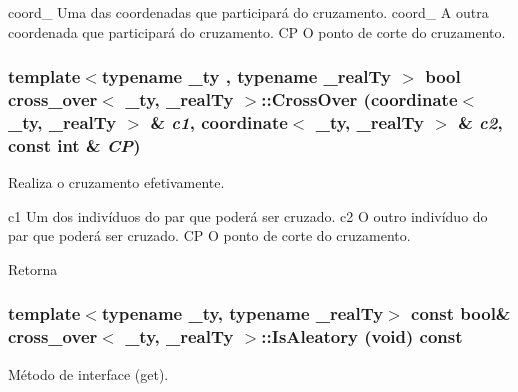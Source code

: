 coord\_ Uma das coordenadas que participará do cruzamento.  coord\_ A outra coordenada que participará do cruzamento.  CP O ponto de corte do cruzamento. \hypertarget{classcross__over_ace759185adf45d08ece996286c69542f}{
\subsubsection[{CrossOver}]{\setlength{\rightskip}{0pt plus 5cm}template$<$typename \_\-ty , typename \_\-realTy $>$ bool {\bf cross\_\-over}$<$ \_\-ty, \_\-realTy $>$::CrossOver ({\bf coordinate}$<$ \_\-ty, \_\-realTy $>$ \& {\em c1}, \/  {\bf coordinate}$<$ \_\-ty, \_\-realTy $>$ \& {\em c2}, \/  const int \& {\em CP})}}
\label{classcross__over_ace759185adf45d08ece996286c69542f}
Realiza o cruzamento efetivamente.

c1 Um dos indivíduos do par que poderá ser cruzado.  c2 O outro indivíduo do par que poderá ser cruzado.  CP O ponto de corte do cruzamento.

\begin{DoxyReturn}{Retorna}

\end{DoxyReturn}
\hypertarget{classcross__over_a62fa09dbf5e970644ea151d78ce8e2eb}{
\subsubsection[{IsAleatory}]{\setlength{\rightskip}{0pt plus 5cm}template$<$typename \_\-ty, typename \_\-realTy$>$ const bool\& {\bf cross\_\-over}$<$ \_\-ty, \_\-realTy $>$::IsAleatory (void) const}}
\label{classcross__over_a62fa09dbf5e970644ea151d78ce8e2eb}
Método de interface (get).

